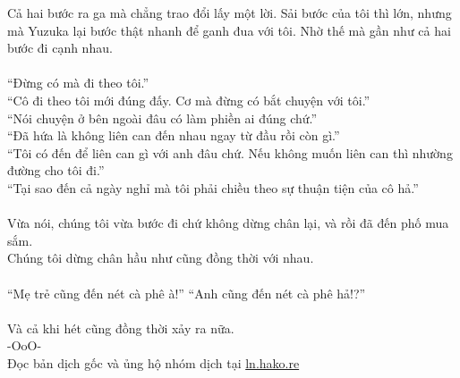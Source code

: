 \documentclass[12pt,a4paper, twosides]{book}
\begin{document}
Cả hai bước ra ga mà chẳng trao đổi lấy một lời. Sải bước của tôi thì lớn, nhưng mà Yuzuka lại bước thật nhanh để ganh đua với tôi. Nhờ thế mà gần như cả hai bước đi cạnh nhau.\\
\\
“Đừng có mà đi theo tôi.”\\
“Cô đi theo tôi mới đúng đấy. Cơ mà đừng có bắt chuyện với tôi.”\\
“Nói chuyện ở bên ngoài đâu có làm phiền ai đúng chứ.”\\
“Đã hứa là không liên can đến nhau ngay từ đầu rồi còn gì.”\\
“Tôi có đến để liên can gì với anh đâu chứ. Nếu không muốn liên can thì nhường đường cho tôi đi.”\\
“Tại sao đến cả ngày nghỉ mà tôi phải chiều theo sự thuận tiện của cô hả.”\\
\\
Vừa nói, chúng tôi vừa bước đi chứ không dừng chân lại, và rồi đã đến phố mua sắm.\\
Chúng tôi dừng chân hầu như cũng đồng thời với nhau.\\
\\
“Mẹ trẻ cũng đến nét cà phê à!” “Anh cũng đến nét cà phê hả!?”\\
\\
Và cả khi hét cũng đồng thời xảy ra nữa.\\
-OoO-\\
Đọc bản dịch gốc và ủng hộ nhóm dịch tại \href{https://ln.hako.re/}{ln.hako.re}\\
\newpage
\end{document}
